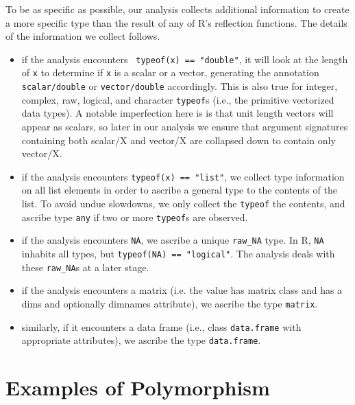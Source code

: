 \documentclass[acmsmall,10pt,review,anonymous]{acmart}\settopmatter{printfolios=true,printccs=false,printacmref=false}
\newcommand{\code}[1]{\lstinline|#1|\xspace}
\begin{document}
To be as specific as possible, our analysis collects additional information
to create a more specific type than the result of any of R's reflection
functions.  The details of the information we collect follows.

\begin{itemize}

	\item if the analysis encounters \code{ typeof(x) == "double"}, it will look at the length of {\tt x} to determine if {\tt x} is a scalar or a vector, generating the annotation {\tt scalar/double} or {\tt vector/double} accordingly.
	This is also true for integer, complex, raw, logical, and character {\tt typeof}s (i.e., the primitive vectorized data types).
	A notable imperfection here is is that unit length vectors will appear as scalars, so later in our analysis we ensure that argument signatures containing both scalar/X and vector/X are collapsed down to contain only vector/X.
	
	\item if the analysis encounters \code{typeof(x) == "list"}, we collect type information on all list elements in order to ascribe a general type to the contents of the list.
	To avoid undue slowdowns, we only collect the \code{typeof} the contents, and ascribe type {\tt any} if two or more {\tt typeof}s are observed.
	
	\item if the analysis encounters \code{NA}, we ascribe a unique {\tt raw\_NA} type.
	In R, \code{NA} inhabits all types, but \code{typeof(NA) == "logical"}.
	The analysis deals with these {\tt raw\_NA}s at a later stage.
	
	\item if the analysis encounters a matrix (i.e. the value has matrix class and has a dims and optionally dimnames attribute), we ascribe the type {\tt matrix}.
	
	\item similarly, if it encounters a data frame (i.e., class {\tt data.frame} with appropriate attributes), we ascribe the type {\tt data.frame}.

\end{itemize}

%
%
%
%
%
%
\section{Examples of Polymorphism}
\label{sec:polyex}

\end{document}
